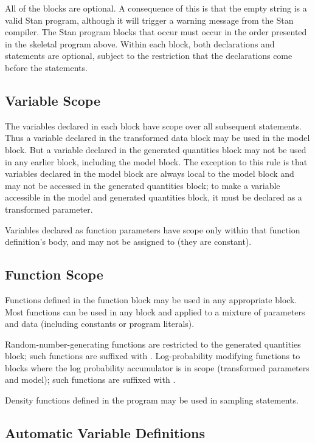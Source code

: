 All of the blocks are optional.  A consequence of this is that the
empty string is a valid Stan program, although it will trigger a
warning message from the Stan compiler.  The Stan program blocks
that occur must occur in the order presented in the skeletal program
above.  Within each block, both declarations and statements are
optional, subject to the  restriction that the declarations come
before the statements.

\subsection{Variable Scope}

The variables declared in each block have scope over all subsequent
statements.  Thus a variable declared in the transformed data block
may be used in the model block.  But a variable declared in the
generated quantities block may not be used in any earlier block,
including the model block.  The exception to this rule is that
variables declared in the model block are always local to the model
block and may not be accessed in the generated quantities block; to
make a variable accessible in the model and generated quantities
block, it must be declared as a transformed parameter.

Variables declared as function parameters have scope only within that
function definition's body, and may not be assigned to (they are
constant).

\subsection{Function Scope}

Functions defined in the function block may be used in any appropriate
block.  Most functions can be used in any block and applied to a
mixture of parameters and data (including constants or program
literals).

Random-number-generating functions are restricted to the generated
quantities block; such functions are suffixed with .
Log-probability modifying functions to blocks where the log
probability accumulator is in scope (transformed parameters and
model); such functions are suffixed with .

Density functions defined in the program may be used in sampling
statements.

\subsection{Automatic Variable Definitions}

